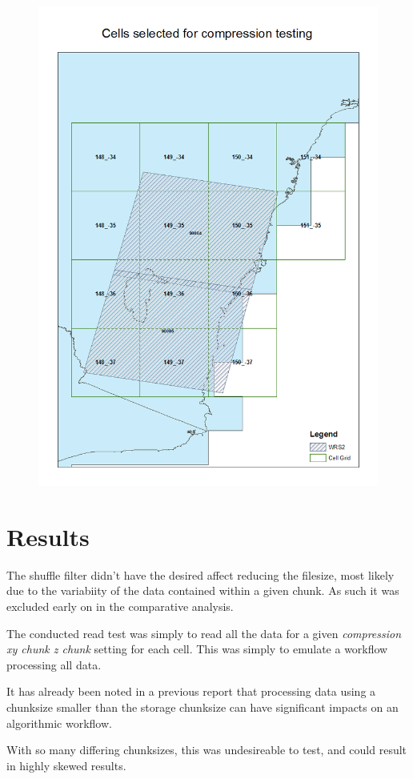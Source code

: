 \documentclass[a4paper]{article}
\begin{document}
    \begin{figure}[h!]
      \centering
      \includegraphics[scale=0.5]{storage-units-compression-testing-selected-area.png}

    \end{figure}

  \newpage

  \section{Results}

    \begin{flushleft}
    The shuffle filter didn't have the desired affect reducing the filesize, most likely due to the variabiity of the data contained within a given chunk.  As such it was excluded early on in the comparative analysis. \par
    The conducted read test was simply to read all the data for a given \textit{compression xy chunk z chunk} setting for each cell. This was simply to emulate a workflow processing all data. \par
    It has already been noted in a previous report that processing data using a chunksize smaller than the storage chunksize can have significant impacts on an algorithmic workflow. \par
    With so many differing chunksizes, this was undesireable to test, and could result in highly skewed results.
    \end{flushleft}
\end{document}
